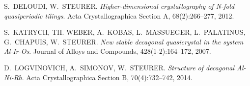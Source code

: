 \documentclass[text.tex]{subfiles}
\begin{document}
\begin{thebibliography}{9}
\uppercase{S.~Deloudi, W.~Steurer.} 
\emph {Higher-dimensional crystallography of N-fold quasiperiodic tilings}. {Acta Crystallographica Section A}, {68}({2}):{266--277}, {2012}.

\uppercase{S.~Katrych, Th. Weber, A.~Kobas, L.~Massueger, L.~Palatinus, G.~Chapuis, W.~Steurer.} 
\emph {New stable decagonal quasicrystal in the system Al-Ir-Os}. {Journal of Alloys and Compounds}, {428}({1-2}):{164--172}, {2007}.

\uppercase{D.~Logvinovich, A.~Simonov, W.~Steurer.} 
\emph {Structure of decagonal Al-Ni-Rh}. {Acta Crystallographica Section B}, {70}({4}):{732--742}, {2014}.
	
\end{thebibliography}
\end{document}
